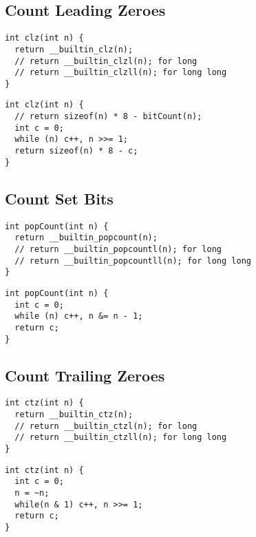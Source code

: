 \documentclass[twoside]{article}
\newcommand{\fileTitleStyle}{\large\underline}
\begin{document}
\begin{multicols*}{2}
\subsectionfont{\centering\bfseries\LARGE}
\subsectionfont{\fileTitleStyle}
\subsection*{Count Leading Zeroes}
\begin{verbatim}
int clz(int n) {
  return __builtin_clz(n);
  // return __builtin_clzl(n); for long
  // return __builtin_clzll(n); for long long
}
\end{verbatim}
\vspace{-12pt}
\begin{verbatim}
int clz(int n) {
  // return sizeof(n) * 8 - bitCount(n);
  int c = 0;
  while (n) c++, n >>= 1;
  return sizeof(n) * 8 - c;
}
\end{verbatim}

\subsectionfont{\centering\bfseries\LARGE}
\subsectionfont{\fileTitleStyle}
\subsection*{Count Set Bits}
\begin{verbatim}
int popCount(int n) {
  return __builtin_popcount(n);
  // return __builtin_popcountl(n); for long
  // return __builtin_popcountll(n); for long long
}
\end{verbatim}
\vspace{-12pt}
\begin{verbatim}
int popCount(int n) {
  int c = 0;
  while (n) c++, n &= n - 1;
  return c;
}
\end{verbatim}

\subsectionfont{\centering\bfseries\LARGE}
\subsectionfont{\fileTitleStyle}
\subsection*{Count Trailing Zeroes}
\begin{verbatim}
int ctz(int n) {
  return __builtin_ctz(n);
  // return __builtin_ctzl(n); for long
  // return __builtin_ctzll(n); for long long
}
\end{verbatim}
\vspace{-12pt}
\begin{verbatim}
int ctz(int n) {
  int c = 0;
  n = ~n;
  while(n & 1) c++, n >>= 1;
  return c;
}
\end{verbatim}


\end{multicols*}
\end{document}
